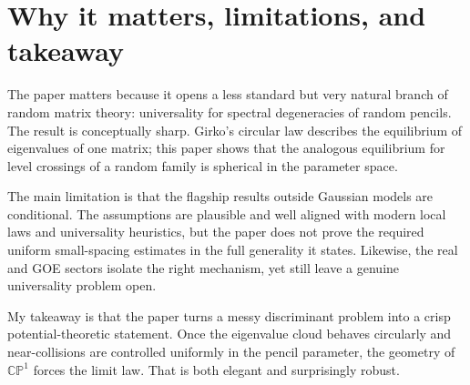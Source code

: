 \documentclass[11pt]{article}
\begin{document}
\section*{Why it matters, limitations, and takeaway}
The paper matters because it opens a less standard but very natural branch of random matrix theory: universality for spectral degeneracies of random pencils. The result is conceptually sharp. Girko's circular law describes the equilibrium of eigenvalues of one matrix; this paper shows that the analogous equilibrium for level crossings of a random family is spherical in the parameter space.

The main limitation is that the flagship results outside Gaussian models are conditional. The assumptions are plausible and well aligned with modern local laws and universality heuristics, but the paper does not prove the required uniform small-spacing estimates in the full generality it states. Likewise, the real and GOE sectors isolate the right mechanism, yet still leave a genuine universality problem open.

My takeaway is that the paper turns a messy discriminant problem into a crisp potential-theoretic statement. Once the eigenvalue cloud behaves circularly and near-collisions are controlled uniformly in the pencil parameter, the geometry of $\mathbb{CP}^1$ forces the limit law. That is both elegant and surprisingly robust.
\end{document}
